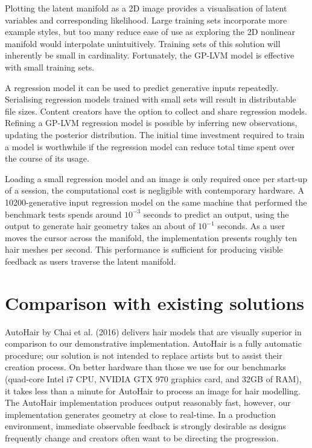 \documentclass[ %
author={Dillon Keith Diep},
supervisor={Dr. Carl Henrik Ek},
degree={MEng},
title={ART-CG Hair:},
subtitle={Assisted Real-time Content Generation of Stylised Virtual Hair},
type={Research},
year={2017} ]{dissertation}
\begin{document}
	Plotting the latent manifold as a 2D image provides a visualisation of latent variables and corresponding likelihood. Large training sets incorporate more example styles, but too many reduce ease of use as exploring the 2D nonlinear manifold would interpolate unintuitively. Training sets of this solution will inherently be small in cardinality. Fortunately, the GP-LVM model is effective with small training sets.
	
	A regression model it can be used to predict generative inputs repeatedly. Serialising regression models trained with small sets will result in distributable file sizes. Content creators have the option to collect and share regression models. Refining a GP-LVM regression model is possible by inferring new observations, updating the posterior distribution. The initial time investment required to train a model is worthwhile if the regression model can reduce total time spent over the course of its usage.
	
	Loading a small regression model and an image is only required once per start-up of a session, the computational cost is negligible with contemporary hardware. A 10200-generative input regression model on the same machine that performed the benchmark tests spends around $10^{-3}$ seconds to predict an output, using the output to generate hair geometry takes an about of $10^{-1}$ seconds. As a user moves the cursor across the manifold, the implementation presents roughly ten hair meshes per second. This performance is sufficient for producing visible feedback as users traverse the latent manifold.
	
	\section{Comparison with existing solutions}
	AutoHair by Chai et al. (2016) \cite{autohair} delivers hair models that are visually superior in comparison to our demonstrative implementation. AutoHair is a fully automatic procedure; our solution is not intended to replace artists but to assist their creation process. On better hardware than those we use for our benchmarks (quad-core Intel i7 CPU, NVIDIA GTX 970 graphics card, and 32GB of RAM), it takes less than a minute for AutoHair to process an image for hair modelling. The AutoHair implementation produces output reasonably fast, however, our implementation generates geometry at close to real-time. In a production environment, immediate observable feedback is strongly desirable as designs frequently change and creators often want to be directing the progression. 
	
\end{document}
